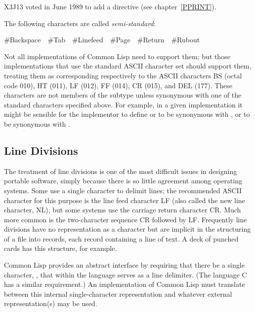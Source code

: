 \begin{newer}
X3J13 voted in June 1989 
to add a  directive \cd{{\Xtilde}{\Xunderscore}} (see chapter~\ref{PPRINT}).
\end{newer}

The following characters are called {\it semi-standard}:
\begin{lisp}
\#{\Xbackslash}Backspace~~\#{\Xbackslash}Tab~~\#{\Xbackslash}Linefeed~~\#{\Xbackslash}Page~~\#{\Xbackslash}Return~~\#{\Xbackslash}Rubout
\end{lisp}
Not all implementations of Common Lisp need to support them; but those
implementations that
use the standard ASCII character set should support them, treating them as
corresponding respectively to the ASCII characters BS (octal code 010),
HT (011), LF (012), FF (014), CR (015), and DEL
(177). These characters are not
members of the subtype  unless synonymous with
one of the standard characters specified above.
For example, in a given implementation it might
be sensible for the implementor to define
 or  to be synonymous with ,
or  to be synonymous with .

\subsection{Line Divisions}

The treatment of line divisions is one of the most difficult issues
in designing portable software, simply because there is so little agreement
among operating systems.  Some use a single character to delimit lines;
the recommended ASCII character for this purpose is the line feed character
LF (also called the new line character, NL),
but some systems use the carriage
return character CR.  Much more common is the two-character sequence
CR followed by LF.  Frequently line divisions have no representation
as a character but are implicit in the structuring of a file into records,
each record containing a line of text.  A deck of punched cards has this
structure, for example.

Common Lisp provides an abstract interface by requiring that there be a single
character, , that within the language serves as a line
delimiter.  (The language C has a similar requirement.)
An implementation of Common Lisp must translate between this internal
single-character representation and whatever external representation(s)
may be used.

